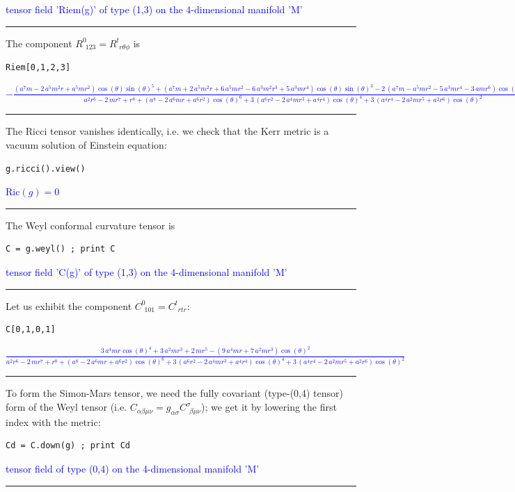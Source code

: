 \documentclass[a4paper]{jpconf}
\newcommand{\soutput}[1]{\textcolor{blue}{#1}\\[-0.8ex]\rule{\textwidth}{0.4pt}}
\begin{document}
\soutput{tensor field 'Riem(g)' of type (1,3) on the 4-dimensional manifold 'M'}
The component $R^0_{\ \, 123} = R^t_{\ \, r\theta\phi}$ is 
\begin{verbatim}
Riem[0,1,2,3]
\end{verbatim}
\soutput{\tiny $-\frac{{\left(a^{7} m - 2 \, a^{5} m^{2} r + a^{5} m r^{2}\right)}
\cos\left(\theta\right) \sin\left(\theta\right)^{5} + {\left(a^{7} m + 2
\, a^{5} m^{2} r + 6 \, a^{5} m r^{2} - 6 \, a^{3} m^{2} r^{3} + 5 \,
a^{3} m r^{4}\right)} \cos\left(\theta\right)
\sin\left(\theta\right)^{3} - 2 \, {\left(a^{7} m - a^{5} m r^{2} - 5 \,
a^{3} m r^{4} - 3 \, a m r^{6}\right)} \cos\left(\theta\right)
\sin\left(\theta\right)}{a^{2} r^{6} - 2 \, m r^{7} + r^{8} +
{\left(a^{8} - 2 \, a^{6} m r + a^{6} r^{2}\right)}
\cos\left(\theta\right)^{6} + 3 \, {\left(a^{6} r^{2} - 2 \, a^{4} m
r^{3} + a^{4} r^{4}\right)} \cos\left(\theta\right)^{4} + 3 \,
{\left(a^{4} r^{4} - 2 \, a^{2} m r^{5} + a^{2} r^{6}\right)}
\cos\left(\theta\right)^{2}}$}
The Ricci tensor vanishes identically, i.e. we check that the Kerr metric is 
a vacuum solution of Einstein equation:
\begin{verbatim}
g.ricci().view()
\end{verbatim}
\soutput{$\mathrm{Ric}(g) = 0$}
The Weyl conformal curvature tensor is
\begin{verbatim}
C = g.weyl() ; print C
\end{verbatim}
\soutput{tensor field 'C(g)' of type (1,3) on the 4-dimensional manifold 'M'}
Let us exhibit the component $C^0_{\ \, 101}=C^t_{\ \, rtr}$:
\begin{verbatim}
C[0,1,0,1]
\end{verbatim}
\soutput{$\frac{3 \, a^{4} m r \cos\left(\theta\right)^{4} + 3 \, a^{2} m r^{3} +
2 \, m r^{5} - {\left(9 \, a^{4} m r + 7 \, a^{2} m r^{3}\right)}
\cos\left(\theta\right)^{2}}{a^{2} r^{6} - 2 \, m r^{7} + r^{8} +
{\left(a^{8} - 2 \, a^{6} m r + a^{6} r^{2}\right)}
\cos\left(\theta\right)^{6} + 3 \, {\left(a^{6} r^{2} - 2 \, a^{4} m
r^{3} + a^{4} r^{4}\right)} \cos\left(\theta\right)^{4} + 3 \,
{\left(a^{4} r^{4} - 2 \, a^{2} m r^{5} + a^{2} r^{6}\right)}
\cos\left(\theta\right)^{2}}$}
To form the Simon-Mars tensor, we need the fully covariant (type-(0,4)
tensor) form of the Weyl tensor (i.e. $C_{\alpha\beta\mu\nu} = g_{\alpha\sigma} C^\sigma_{\ \, \beta\mu\nu}$); we get it by lowering the first index with the metric:
\begin{verbatim}
Cd = C.down(g) ; print Cd
\end{verbatim}
\soutput{tensor field of type (0,4) on the 4-dimensional manifold 'M'}
\end{document}
